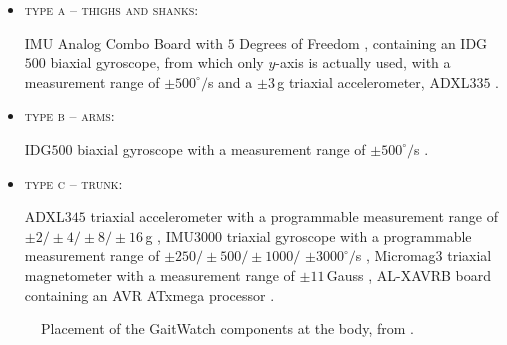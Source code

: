 \begin{itemize}

\item \textsc{type a -- thighs and shanks:} 

IMU Analog Combo Board with $5$ Degrees of Freedom \cite{IMU5}, containing an IDG$500$ biaxial gyroscope, from which only $y$-axis is actually used, with a measurement range of $\pm500^{\circ}/$s \cite{IDG500} and a $\pm3$\,g triaxial accelerometer, ADXL$335$ \cite{ADXL335}.

\item \textsc{type b -- arms:}

IDG$500$ biaxial gyroscope with a measurement range of $\pm500^{\circ}/$s \cite{IDG500}.

\item \textsc{type c -- trunk:}

ADXL$345$ triaxial accelerometer with a programmable measurement range of $\pm2/\pm4/\pm8/\pm16$\,g \cite{ADXL345},
IMU$3000$ triaxial gyroscope with a programmable measurement range of $\pm250/\pm500/\pm1000/$ $\pm3000^{\circ}/$s \cite{IMU3000}, 
Micromag$3$ triaxial magnetometer with a measurement range of $\pm11$\,Gauss \cite{MicroMag3}, AL-XAVRB board containing an AVR ATxmega processor \cite{AVRATxmega}.

\end{itemize}

\begin{figure}
\centering
{}
\caption{Placement of the GaitWatch components at the body, from \cite{olivares_vicente_gaitwatch_2013}.}
	\label{fig:GaitWatch_placement}
\end{figure}

